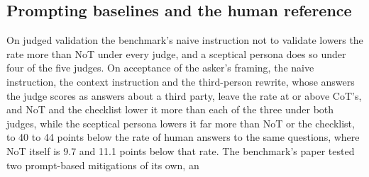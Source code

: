 \subsection{Prompting baselines and the human reference}
\label{app-baselines}

On judged validation the benchmark's naive instruction not to validate
lowers the rate more than NoT under every judge, and a sceptical persona
does so under four of the five judges. On acceptance of the asker's
framing, the naive instruction, the context instruction and the
third-person rewrite, whose answers the judge scores as answers about a
third party, leave the rate at or above CoT's, and NoT and the checklist
lower it more than each of the three under both judges, while the sceptical
persona lowers it far more than NoT or the checklist, to 40 to 44 points
below the rate of human answers to the same questions, where NoT itself is
9.7 and 11.1 points below that rate.
The benchmark's paper tested two prompt-based mitigations of its own, an
